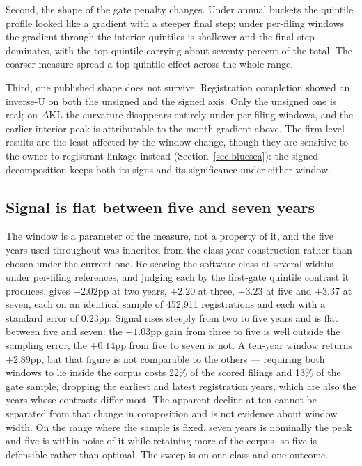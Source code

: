 \documentclass[11pt]{article}
\newcommand{\dkl}{$\Delta$KL}
\begin{document}
Second, the shape of the gate penalty changes. Under annual buckets the
quintile profile looked like a gradient with a steeper final step; under
per-filing windows the gradient through the interior quintiles is shallower
and the final step dominates, with the top quintile carrying about seventy
percent of the total.
The coarser measure spread a top-quintile effect across the whole range.

Third, one published shape does not survive. Registration completion showed
an inverse-U on both the unsigned and the signed axis. Only the unsigned one
is real; on \dkl{} the curvature disappears entirely under per-filing
windows, and the earlier interior peak is attributable to the month
gradient above. The firm-level results are the least affected by the window change,
though they are sensitive to the owner-to-registrant linkage instead
(Section~\ref{sec:bluesea}): the signed decomposition keeps both its signs
and its significance under either window.

\subsection{Signal is flat between five and seven years}\label{app:wsweep}

The window is a parameter of the measure, not a property of it, and the five
years used throughout was inherited from the class-year construction rather
than chosen under the current one. Re-scoring the software class at several
widths under per-filing references, and judging each by the first-gate
quintile contrast it produces, gives $+2.02$pp at two years, $+2.20$ at
three, $+3.23$ at five and $+3.37$ at seven, each on an identical sample of
452{,}911 registrations and each with a standard error of $0.23$pp. Signal
rises steeply from two to five years and is flat between five and seven: the
$+1.03$pp gain from three to five is well outside the sampling error, the
$+0.14$pp from five to seven is not. A ten-year window returns $+2.89$pp,
but that figure is not comparable to the others --- requiring both windows
to lie inside the corpus costs 22\% of the scored filings and 13\% of the
gate sample, dropping the earliest and latest registration years, which are
also the years whose contrasts differ most. The apparent decline at ten
cannot be separated from that change in composition and is not evidence
about window width. On the range where the sample is fixed, seven years is
nominally the peak and five is within noise of it while retaining more of
the corpus, so five is defensible rather than optimal. The sweep is on one class
and one outcome.
\end{document}
